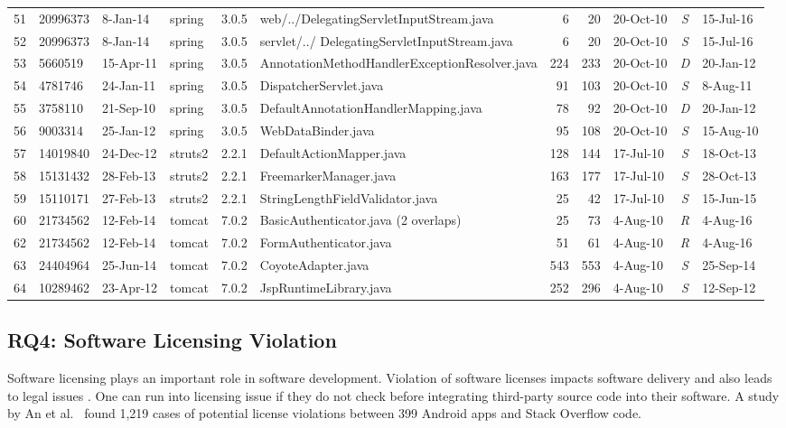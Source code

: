 \documentclass[sigconf,review, anonymous]{acmart}
\begin{document}
\begin{table}
{\begin{tabular}{r|l|l|l|l|p{5.2cm}|r|r|l|c|l}
			51 & 20996373 & 8-Jan-14 & spring & 3.0.5  & web/../DelegatingServletInputStream.java & 6 & 20 & 20-Oct-10 & \textit{S} & 15-Jul-16 \\
			52 & 20996373 & 8-Jan-14 & spring & 3.0.5  & servlet/../ DelegatingServletInputStream.java & 6 & 20 & 20-Oct-10 & \textit{S} & 15-Jul-16 \\
			53 & 5660519 & 15-Apr-11 & spring & 3.0.5 & AnnotationMethodHandlerException\newline Resolver.java & 224 & 233 & 20-Oct-10 & \textit{D} & 20-Jan-12 \\
			54 & 4781746 & 24-Jan-11 & spring & 3.0.5  & DispatcherServlet.java & 91 & 103 & 20-Oct-10 & \textit{S} & 8-Aug-11 \\
			55 & 3758110 & 21-Sep-10 & spring & 3.0.5  & DefaultAnnotationHandlerMapping.java & 78 & 92 & 20-Oct-10 & \textit{D} & 20-Jan-12 \\
			56 & 9003314 & 25-Jan-12 & spring & 3.0.5  & WebDataBinder.java & 95 & 108 & 20-Oct-10 & \textit{S} & 15-Aug-10 \\
			57 & 14019840 & 24-Dec-12 & struts2 & 2.2.1  & DefaultActionMapper.java & 128 & 144 & 17-Jul-10 & \textit{S} & 18-Oct-13 \\
			58 & 15131432 & 28-Feb-13 & struts2 & 2.2.1  & FreemarkerManager.java & 163 & 177 & 17-Jul-10 & \textit{S} & 28-Oct-13 \\
			59 & 15110171 & 27-Feb-13 & struts2 & 2.2.1  & StringLengthFieldValidator.java & 25 & 42 & 17-Jul-10 & \textit{S} & 15-Jun-15 \\
			60 & 21734562 & 12-Feb-14 & tomcat & 7.0.2  & BasicAuthenticator.java (2 overlaps) & 25 & 73 & 4-Aug-10 & \textit{R} & 4-Aug-16 \\
			62 & 21734562 & 12-Feb-14 & tomcat & 7.0.2  & FormAuthenticator.java & 51 & 61 & 4-Aug-10 & \textit{R} & 4-Aug-16 \\
			63 & 24404964 & 25-Jun-14 & tomcat & 7.0.2  & CoyoteAdapter.java & 543 & 553 & 4-Aug-10 & \textit{S} & 25-Sep-14 \\
			64 & 10289462 & 23-Apr-12 & tomcat & 7.0.2  & JspRuntimeLibrary.java & 252 & 296 & 4-Aug-10 & \textit{S} & 12-Sep-12 \\
			\hline
	\end{tabular} %
}
\end{table}

\subsection{RQ4: Software Licensing Violation}
Software licensing plays an important role in software development. Violation of software licenses impacts software delivery and also leads to legal issues \cite{Sprigman2015}. 
One can run into licensing issue if they do not check before integrating third-party source code into their software. A study by An et al.~\cite{An2017} found 1,219 cases of potential license violations between 399 Android apps and Stack Overflow code. %
\end{document}
